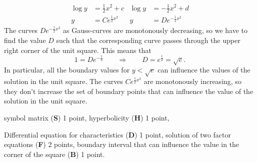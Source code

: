 \begin{loesung}
\begin{teilaufgaben}
\begin{align*}
      \log y &=\frac12x^2+ c   & \log y       &= -\frac12x^2 + d
\\
           y &= Ce^{\frac12x^2}&            y&= D e^{-\frac12x^2}
\end{align*}
The curves $De^{-\frac12x^2}$ as Gauss-curves are monotonously
decreasing, so we have to find the value $D$ such that the corresponding
curve passes through the upper right corner of the unit square.
This means that
\[
1 = De^{-\frac12}
\qquad\Rightarrow\qquad
D=e^{\frac12}=\sqrt{e}.
\]
In particular, all the boundary values for $y<\sqrt{e}$ can influence
the values of the solution in the unit square.
The curves $Ce^{\frac12x^2}$ are monotonously increasing, so they
don't increase the set of boundary points that can influence the 
value of the solution in the unit square.
\qedhere
\end{teilaufgaben}
\end{loesung}

\begin{bewertung}
\begin{teilaufgaben}
\item symbol matrix ({\bf S}) 1 point,
hyperbolicity ({\bf H}) 1 point,
\item Differential equation for characteristics ({\bf D}) 1 point,
solution of two factor equations ({\bf F}) 2 points,
boundary interval that can influence the value in the corner of the
square ({\bf B}) 1 point.
\end{teilaufgaben}
\end{bewertung}

